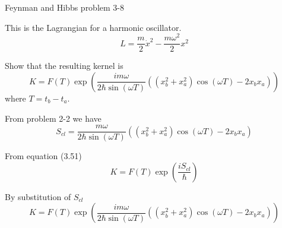\documentclass[12pt]{article}
\begin{document}
\noindent
Feynman and Hibbs problem 3-8

\bigskip
\noindent
This is the Lagrangian for a harmonic oscillator.
\begin{equation*}
L=\frac{m}{2}\dot x^2-\frac{m\omega^2}{2}x^2
\end{equation*}

\noindent
Show that the resulting kernel is
\begin{equation*}
K=F(T)\exp\left(
\frac{im\omega}{2\hbar\sin(\omega T)}
\left((x_b^2+x_a^2)\cos(\omega T)-2x_b x_a\right)
\right)
\end{equation*}
where $T=t_b-t_a$.

\bigskip
\noindent
From problem 2-2 we have
\begin{equation*}
S_{cl}=\frac{m\omega}{2\hbar\sin(\omega T)}
\left((x_b^2+x_a^2)\cos(\omega T)-2x_b x_a\right)
\end{equation*}

\noindent
From equation (3.51)
\begin{equation*}
K=F(T)\exp\left(
\frac{iS_{cl}}{\hbar}
\right)
\end{equation*}

\noindent
By substitution of $S_{cl}$
\begin{equation*}
K=F(T)\exp\left(
\frac{im\omega}{2\hbar\sin(\omega T)}
\left((x_b^2+x_a^2)\cos(\omega T)-2x_b x_a\right)
\right)
\end{equation*}
\end{document}
